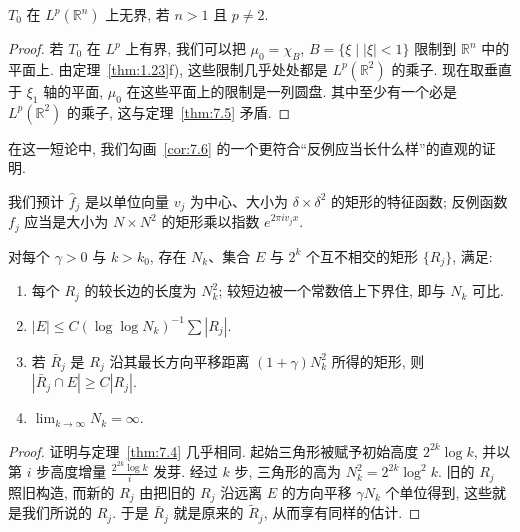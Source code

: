 \begin{corollary}\label{cor:7.6}
$T_0$ 在 $L^p(\mathbb{R}^n)$ 上无界, 若 $n>1$ 且 $p\neq 2$.
\end{corollary}

\begin{proof}
若 $T_0$ 在 $L^p$ 上有界, 我们可以把 $\mu_0=\chi_B$, $B=\{\xi \mid |\xi|<1\}$ 限制到 $\mathbb{R}^n$ 中的平面上. 由定理~\ref{thm:1.23}f), 这些限制几乎处处都是 $L^p(\mathbb{R}^2)$ 的乘子. 现在取垂直于 $\xi_1$ 轴的平面, $\mu_0$ 在这些平面上的限制是一列圆盘. 其中至少有一个必是 $L^p(\mathbb{R}^2)$ 的乘子, 这与定理~\ref{thm:7.5} 矛盾.
\end{proof}


在这一短论中, 我们勾画~\ref*{cor:7.6} 的一个更符合``反例应当长什么样''的直观的证明.

我们预计 $\hat{f}_j$ 是以单位向量 $v_j$ 为中心、大小为 $\delta\times\delta^2$ 的矩形的特征函数; 反例函数 $f_j$ 应当是大小为 $N\times N^2$ 的矩形乘以指数 $e^{2\pi iv_jx}$.

\begin{lemma}\label{lem:7.8}
对每个 $\gamma>0$ 与 $k>k_0$, 存在 $N_k$、集合 $E$ 与 $2^k$ 个互不相交的矩形 $\{R_j\}$, 满足:
\begin{enumerate}[label=\arabic*)]
\item 每个 $R_j$ 的较长边的长度为 $N_k^2$; 较短边被一个常数倍上下界住, 即与 $N_k$ 可比.
\item $|E|\leq C(\log\log N_k)^{-1}\sum|R_j|$.
\item 若 $\bar{R}_j$ 是 $R_j$ 沿其最长方向平移距离 $(1+\gamma)N_k^2$ 所得的矩形, 则 $|\bar{R}_j\cap E|\geq C|R_j|$.
\item $\lim_{k\to\infty}N_k=\infty$.
\end{enumerate}
\end{lemma}

\begin{proof}
证明与定理~\ref{thm:7.4} 几乎相同. 起始三角形被赋予初始高度 $2^{2k}\log k$, 并以第 $i$ 步高度增量 $\frac{2^{2k}\log k}{i}$ 发芽. 经过 $k$ 步, 三角形的高为 $N_k^2=2^{2k}\log^{2}k$. 旧的 $R_j$ 照旧构造, 而新的 $R_j$ 由把旧的 $R_j$ 沿远离 $E$ 的方向平移 $\gamma N_k$ 个单位得到, 这些就是我们所说的 $R_j$. 于是 $\bar{R}_j$ 就是原来的 $\tilde{R}_j$, 从而享有同样的估计.
\end{proof}

\par\vspace{1.2em}
{\par}
\vspace{0.4em}

